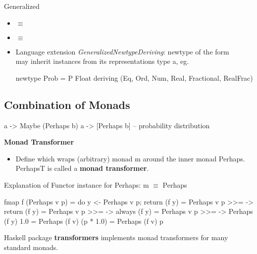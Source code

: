 Generalized 
\begin{itemize}
    \item {} $\equiv$ 
    \item {} $\equiv$ 
\end{itemize}

\begin{itemize}
    \item Language extension \emph{GeneralizedNewtypeDeriving}: newtype of the form \\  may inherit instances from its representations type a, eg.
    \begin{codebox}[haskell]
    newtype Prob = P Float
        deriving (Eq, Ord, Num, Real, Fractional, RealFrac)
    \end{codebox}
\end{itemize}



\subsection*{Combination of Monads}

\begin{codebox}[haskell]
a -> Maybe (Perhaps b)
a -> [Perhaps b] -- probability distribution
\end{codebox}


\textbf{Monad Transformer}
\begin{itemize}
    \item Define  which wraps (arbitrary) monad m around the inner monad Perhaps. PerhapsT is called a \textbf{monad transformer}.
\end{itemize}



Explanation of Functor instance for Perhaps:
m $\equiv$ Perhaps

\begin{codebox}[haskell]
  fmap f (Perhaps v p)
= do y <- Perhaps v p; return (f y)
= Perhaps v p >>= \y -> return (f y)
= Perhaps v p >>= \y -> always (f y)
= Perhaps v p >>= \y -> Perhaps (f y) 1.0
= Perhaps (f v) (p * 1.0)
= Perhaps (f v) p
\end{codebox}

Haskell package \textbf{transformers} implements monad transformers for many standard monads.
















